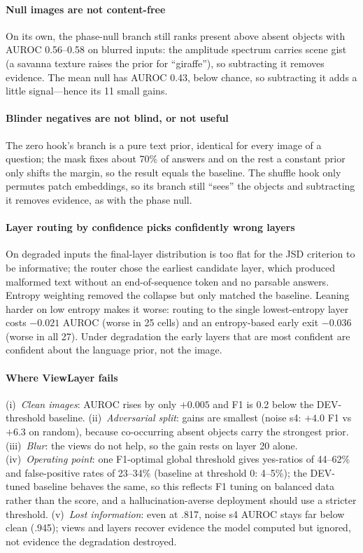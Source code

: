 \documentclass[10pt,a4paper]{article}
\newcommand{\ours}{ViewLayer}
\begin{document}
\paragraph{Null images are not content-free} On its own, the phase-null branch still ranks present above absent objects with AUROC 0.56--0.58 on blurred inputs: the amplitude spectrum carries scene gist~\citep{oliva2001gist} (a savanna texture raises the prior for ``giraffe''), so subtracting it removes evidence. The mean null has AUROC 0.43, below chance, so subtracting it adds a little signal---hence its 11 small gains.

\paragraph{Blinder negatives are not blind, or not useful} The zero hook's branch is a pure text prior, identical for every image of a question; the mask fixes about 70\% of answers and on the rest a constant prior only shifts the margin, so the result equals the baseline. The shuffle hook only permutes patch embeddings, so its branch still ``sees'' the objects and subtracting it removes evidence, as with the phase null.

\paragraph{Layer routing by confidence picks confidently wrong layers} On degraded inputs the final-layer distribution is too flat for the JSD criterion to be informative; the router chose the earliest candidate layer, which produced malformed text without an end-of-sequence token and no parsable answers. Entropy weighting removed the collapse but only matched the baseline. Leaning harder on low entropy makes it worse: routing to the single lowest-entropy layer costs $-0.021$ AUROC (worse in 25 cells) and an entropy-based early exit $-0.036$ (worse in all 27). Under degradation the early layers that are most confident are confident about the language prior, not the image.

\paragraph{Where \ours{} fails} (i)~\emph{Clean images}: AUROC rises by only $+0.005$ and F1 is 0.2 below the DEV-threshold baseline. (ii)~\emph{Adversarial split}: gains are smallest (noise s4: $+4.0$ F1 vs $+6.3$ on random), because co-occurring absent objects carry the strongest prior. (iii)~\emph{Blur}: the views do not help, so the gain rests on layer 20 alone. (iv)~\emph{Operating point}: one F1-optimal global threshold gives yes-ratios of 44--62\% and false-positive rates of 23--34\% (baseline at threshold 0: 4--5\%); the DEV-tuned baseline behaves the same, so this reflects F1 tuning on balanced data rather than the score, and a hallucination-averse deployment should use a stricter threshold. (v)~\emph{Lost information}: even at .817, noise s4 AUROC stays far below clean (.945); views and layers recover evidence the model computed but ignored, not evidence the degradation destroyed.
\end{document}
